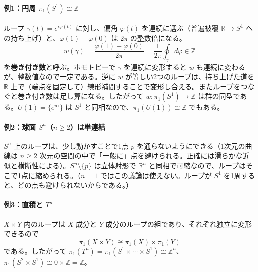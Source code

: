 \documentclass[uplatex, dvipdfmx, book]{jsbook}
\begin{document}
\paragraph{例1：円周 $\pi_1(S^1) \cong \mathbb{Z}$}
ループ $\gamma(t) = e^{i\varphi(t)}$ に対し、偏角 $\varphi(t)$ を連続に選ぶ（普遍被覆 $\mathbb{R} \to S^1$ への持ち上げ）と、$\varphi(1) - \varphi(0)$ は $2\pi$ の整数倍になる。
\begin{equation}
    w(\gamma) = \frac{\varphi(1) - \varphi(0)}{2\pi} = \frac{1}{2\pi}\oint_\gamma d\varphi \in \mathbb{Z}
\end{equation}
を\textbf{巻き付き数}と呼ぶ。ホモトピーで $\gamma$ を連続に変形すると $w$ も連続に変わるが、整数値なので一定である。逆に $w$ が等しい2つのループは、持ち上げた道を $\mathbb{R}$ 上で（端点を固定して）線形補間することで変形し合える。またループをつなぐと巻き付き数は足し算になる。したがって $w: \pi_1(S^1) \to \mathbb{Z}$ は群の同型である。$U(1) = \{e^{i\alpha}\}$ は $S^1$ と同相なので、$\pi_1(U(1)) \cong \mathbb{Z}$ でもある。

\paragraph{例2：球面 $S^n$（$n \ge 2$）は単連結}
$S^n$ 上のループは、少し動かすことで1点 $p$ を通らないようにできる（1次元の曲線は $n \ge 2$ 次元の空間の中で「一般に」点を避けられる。正確には滑らかな近似と横断性による）。$S^n \setminus \{p\}$ は立体射影で $\mathbb{R}^n$ と同相で可縮なので、ループはそこで1点に縮められる。（$n = 1$ ではこの議論は使えない。ループが $S^1$ を1周すると、どの点も避けられないからである。）

\paragraph{例3：直積と $T^n$}
$X \times Y$ 内のループは $X$ 成分と $Y$ 成分のループの組であり、それぞれ独立に変形できるので
\begin{equation}
    \pi_1(X \times Y) \cong \pi_1(X) \times \pi_1(Y)
\end{equation}
である。したがって $\pi_1(T^n) = \pi_1(S^1 \times \cdots \times S^1) \cong \mathbb{Z}^n$、$\pi_1(S^2 \times S^1) \cong 0 \times \mathbb{Z} = \mathbb{Z}$。
\end{document}
